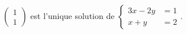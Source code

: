 $\begin{pmatrix}1\\1\end{pmatrix}$ est l'unique solution de $\begin{cases}3x-2y &= 1 \\ x+y &= 2\end{cases}$.

\begin{reponses}
\end{reponses}

